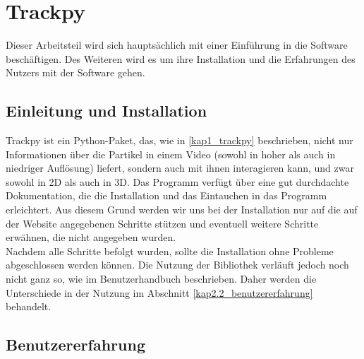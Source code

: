 \chapter{Trackpy}

Dieser Arbeitsteil  wird sich hauptsächlich mit einer Einführung in die Software beschäftigen. Des Weiteren wird es um ihre Installation und die Erfahrungen des Nutzers mit der Software gehen.

\section{Einleitung und Installation \label{Kap2.1_Einleitung_Installation}}
Trackpy ist ein Python-Paket, das, wie in \ref{kap1_trackpy} beschrieben, nicht nur Informationen über die Partikel in einem Video (sowohl in hoher als auch in niedriger Auflösung) liefert, sondern auch mit ihnen interagieren kann, und zwar sowohl in 2D als auch in 3D. Das Programm verfügt über eine gut durchdachte Dokumentation, die die Installation und das Eintauchen in das Programm erleichtert.
Aus diesem Grund werden wir uns bei der Installation nur auf die auf der Website \cite{tp_installation} angegebenen Schritte stützen und eventuell weitere Schritte erwähnen, die nicht angegeben wurden.\\
Nachdem alle Schritte befolgt wurden, sollte die Installation ohne Probleme abgeschlossen werden können. Die Nutzung der Bibliothek verläuft jedoch noch nicht ganz so, wie im Benutzerhandbuch beschrieben. Daher werden die Unterschiede in der Nutzung im Abschnitt \ref{kap2.2_benutzererfahrung} behandelt.


\section{Benutzererfahrung \label{kap2.2_benutzererfahrung}}


